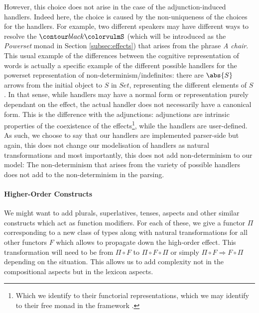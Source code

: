 However, this choice does not arise in the case of the adjunction-induced
handlers.
Indeed here, the choice is caused by the non-uniqueness of the choices for
the handlers.
For example, two different speakers may have different ways to resolve the
$\f{S}$ (which will be introduced as the \emph{Powerset} monad in Section
\ref{subsec:effects}) that arises from the phrase \textsl{A chair}.
This usual example of the differences between the cognitive representation of
words is actually a specific example of the different possible handlers for the
powerset representation of non-determinism/indefinites:
there are $\abs{S}$ arrows from the initial object to $S$ in $\mathit{Set}$,
representing the different elements of $S$.
In that sense, while handlers may have a normal form or representation purely
dependant on the effect, the actual handler does not necessarily have
a canonical form.
This is the difference with the adjunctions: adjunctions are intrinsic
properties of the coexistence of the effects\footnote{Which we identify to
	their functorial representations, which we may identify to their free monad in
	the framework \cite{vandenbergFrameworkHigherorderEffects2024}.}, while the
handlers are user-defined.
As such, we choose to say that our handlers are implemented parser-side but
again, this does not change our modelisation of handlers as natural
transformations and most importantly, this does not add non-determinism to our
model: The non-determinism that arises from the variety of possible handlers
does not add to the non-determinism in the parsing.

\paragraph{Higher-Order Constructs}
\label{par:higherorder}
We might want to add plurals, superlatives, tenses, aspects and other similar
constructs which act as function modifiers.
For each of these, we give a functor $\Pi$ corresponding to a new class of
types along with natural transformations for all other functors $F$ which
allows to propagate down the high-order effect.
This transformation will need to be from $\Pi \circ F$ to
$\Pi \circ F \circ \Pi$ or simply $\Pi \circ F \Rightarrow F \circ \Pi$
depending on the situation.
This allows us to add complexity not in the compositional aspects but
in the lexicon aspects.

